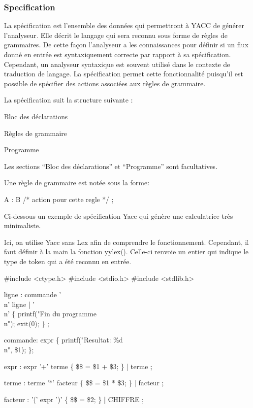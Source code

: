 \documentclass{article}
\begin{document}
\subsubsection{Specification}
La spécification est l’ensemble des données qui permettront à YACC de générer l’analyseur. Elle décrit le langage qui sera reconnu sous forme de règles de grammaires. De cette façon l’analyseur a les connaissances pour définir si un flux donné en entrée est syntaxiquement correcte par rapport à sa spécification.
Cependant, un analyseur syntaxique est souvent utilisé dans le contexte de traduction de langage. La spécification permet cette fonctionnalité puisqu’il est possible de spécifier des actions associées aux règles de grammaire.

La spécification suit la structure suivante :

Bloc des déclarations


Règles de grammaire


Programme

Les sections “Bloc des déclarations” et “Programme” sont facultatives.

Une règle de grammaire est notée sous la forme:

A : B { /* action pour cette regle */ };

Ci-dessous un exemple de spécification Yacc qui génère une calculatrice très minimaliste.

Ici, on utilise Yacc sans Lex afin de comprendre le fonctionnement. Cependant, il faut définir à la main la fonction yylex(). Celle-ci renvoie un entier qui indique le type de token qui a été reconnu en entrée.

    \#include <ctype.h>
    \#include <stdio.h>
    \#include <stdlib.h>


ligne : commande '\\n' ligne
    | '\\n' \{ printf("Fin du programme\\n"); exit(0); \}
    ;

commande: expr \{ printf("Resultat: \%d\\n", \$1); \};


expr : expr '+' terme \{ \$\$ = \$1 + \$3; \}
    | terme
    ;
   
terme : terme '*' facteur \{ \$\$ = \$1 * \$3; \}
    | facteur
    ;
   
facteur : '(' expr ')' \{ \$\$ = \$2; \}
    | CHIFFRE
    ;
\end{document}
